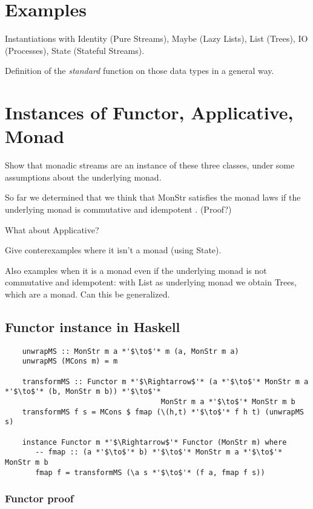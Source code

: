 \documentclass{article}
\begin{document}
\section{Examples}

Instantiations with Identity (Pure Streams), Maybe (Lazy Lists), List (Trees), IO (Processes), State (Stateful Streams).

Definition of the {\em standard} function on those data types in a general way.

\section{Instances of Functor, Applicative, Monad}

Show that monadic streams are an instance of these three classes, under some assumptions about the underlying monad.

So far we determined that we think that MonStr satisfies the monad laws if the underlying monad is commutative and idempotent \cite{idempotent_monads}. (Proof?)

What about Applicative?

Give conterexamples where it isn't a monad (using State).

Also examples when it is a monad even if the underlying monad is not commutative and idempotent: with List as underlying monad we obtain Trees, which are a monad. Can this be generalized.

\subsection{Functor instance in Haskell}

\begin{lstlisting}
	unwrapMS :: MonStr m a *'$\to$'* m (a, MonStr m a)
	unwrapMS (MCons m) = m

	transformMS :: Functor m *'$\Rightarrow$'* (a *'$\to$'* MonStr m a *'$\to$'* (b, MonStr m b)) *'$\to$'* 
	                                MonStr m a *'$\to$'* MonStr m b
	transformMS f s = MCons $ fmap (\(h,t) *'$\to$'* f h t) (unwrapMS s)

	instance Functor m *'$\Rightarrow$'* Functor (MonStr m) where
	   -- fmap :: (a *'$\to$'* b) *'$\to$'* MonStr m a *'$\to$'* MonStr m b
	   fmap f = transformMS (\a s *'$\to$'* (f a, fmap f s))
\end{lstlisting}

\subsubsection{Functor proof}
\end{document}
